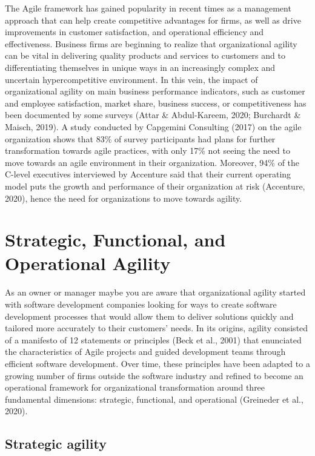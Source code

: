\documentclass[
  letterpaper,
  DIV=11,
  numbers=noendperiod]{scrreprt}
\begin{document}
The Agile framework has gained popularity in recent times as a
management approach that can help create competitive advantages for
firms, as well as drive improvements in customer satisfaction, and
operational efficiency and effectiveness. Business firms are beginning
to realize that organizational agility can be vital in delivering
quality products and services to customers and to differentiating
themselves in unique ways in an increasingly complex and uncertain
hypercompetitive environment. In this vein, the impact of organizational
agility on main business performance indicators, such as customer and
employee satisfaction, market share, business success, or
competitiveness has been documented by some surveys (Attar \&
Abdul-Kareem, 2020; Burchardt \& Maisch, 2019). A study conducted by
Capgemini Consulting (2017) on the agile organization shows that 83\% of
survey participants had plans for further transformation towards agile
practices, with only 17\% not seeing the need to move towards an agile
environment in their organization. Moreover, 94\% of the C-level
executives interviewed by Accenture said that their current operating
model puts the growth and performance of their organization at risk
(Accenture, 2020), hence the need for organizations to move towards
agility.

\hypertarget{strategic-functional-and-operational-agility}{%
\section{Strategic, Functional, and Operational
Agility}\label{strategic-functional-and-operational-agility}}

As an owner or manager maybe you are aware that organizational agility
started with software development companies looking for ways to create
software development processes that would allow them to deliver
solutions quickly and tailored more accurately to their customers'
needs. In its origins, agility consisted of a manifesto of 12 statements
or principles (Beck et al., 2001) that enunciated the characteristics of
Agile projects and guided development teams through efficient software
development. Over time, these principles have been adapted to a growing
number of firms outside the software industry and refined to become an
operational framework for organizational transformation around three
fundamental dimensions: strategic, functional, and operational
(Greineder et al., 2020).

\hypertarget{strategic-agility}{%
\subsection{Strategic agility}\label{strategic-agility}}
\end{document}
